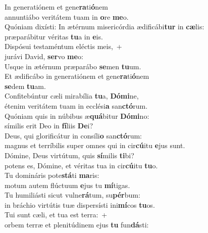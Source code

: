 \evenverse In generatiónem et gene\textbf{ra}ti\textbf{ó}nem~\*\\
\evenverse annuntiábo veritátem tuam in \textbf{o}re \textbf{me}o.\\
\oddverse Quóniam dixísti: In ætérnum misericórdia ædificábi\textbf{tur} in \textbf{cæ}lis:~\*\\
\oddverse præparábitur véritas \textbf{tu}a in \textbf{e}is.\\
\evenverse Dispósui testaméntum eléctis meis,~+\\
\evenverse  jurávi David, \textbf{ser}vo \textbf{me}o:~\*\\
\evenverse Usque in ætérnum præparábo \textbf{se}men \textbf{tu}um.\\
\oddverse Et ædificábo in generatiónem et gene\textbf{ra}ti\textbf{ó}nem~\*\\
\oddverse \textbf{se}dem \textbf{tu}am.\\
\evenverse Confitebúntur cæli mirabília \textbf{tu}a, \textbf{Dó}\textbf{mi}ne,~\*\\
\evenverse étenim veritátem tuam in ecclési\textbf{a} san\textbf{ctó}rum.\\
\oddverse Quóniam quis in núbibus æ\textbf{quá}bitur \textbf{Dó}\textbf{mi}no:~\*\\
\oddverse símilis erit Deo in \textbf{fí}liis \textbf{De}i?\\
\evenverse Deus, qui glorificátur in consíli\textbf{o} san\textbf{ctó}rum:~\*\\
\evenverse magnus et terríbilis super omnes qui in cir\textbf{cú}itu \textbf{e}jus sunt.\\
\oddverse Dómine, Deus virtútum, quis \textbf{sí}milis \textbf{ti}bi?~\*\\
\oddverse potens es, Dómine, et véritas tua in cir\textbf{cú}itu \textbf{tu}o.\\
\evenverse Tu domináris pote\textbf{stá}ti \textbf{ma}ris:~\*\\
\evenverse motum autem flúctuum \textbf{e}jus tu \textbf{mí}tigas.\\
\oddverse Tu humiliásti sicut vulne\textbf{rá}tum, su\textbf{pér}bum:~\*\\
\oddverse in bráchio virtútis tuæ dispersísti ini\textbf{mí}cos \textbf{tu}os.\\
\evenverse Tui sunt cæli, et tua est terra:~+\\
\evenverse  orbem terræ et plenitúdinem ejus \textbf{tu} fun\textbf{dá}sti:~\*\\
